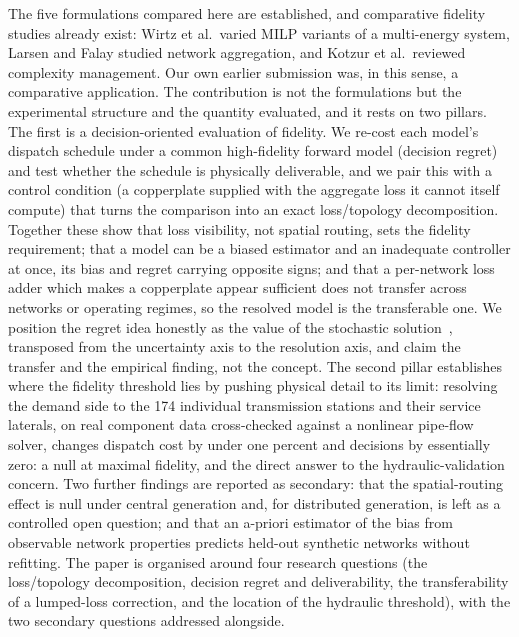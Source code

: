 \documentclass[a4paper,fleqn]{cas-sc}
\providecommand{\citep}[1]{\cite{#1}}
\begin{document}
The five formulations compared here are established, and comparative fidelity studies
already exist: Wirtz et al.\ varied MILP variants of a multi-energy system, Larsen and
Falay studied network aggregation, and Kotzur et al.\ reviewed complexity management. Our
own earlier submission was, in this sense, a comparative application. The contribution is
not the formulations but the experimental structure and the quantity evaluated, and it
rests on two pillars. The first is a decision-oriented evaluation of fidelity. We re-cost
each model's dispatch schedule under a common high-fidelity forward model (decision regret)
and test whether the schedule is physically deliverable, and we pair this with a control
condition (a copperplate supplied with the aggregate loss it cannot itself compute)
that turns the comparison into an exact loss/topology decomposition. Together these show
that loss visibility, not spatial routing, sets the fidelity requirement; that a model can
be a biased estimator and an inadequate controller at once, its bias and regret carrying
opposite signs; and that a per-network loss adder which makes a copperplate appear
sufficient does not transfer across networks or operating regimes, so the resolved model is
the transferable one. We position the regret idea honestly as the value of the stochastic
solution~\citep{BirgeLouveaux2011}, transposed from the uncertainty axis to the resolution
axis, and claim the transfer and the empirical finding, not the concept. The second pillar establishes where the fidelity
threshold lies by pushing physical detail to its limit: resolving the demand side to the 174
individual transmission stations and their service laterals, on real component data
cross-checked against a nonlinear pipe-flow solver, changes dispatch cost by under one
percent and decisions by essentially zero: a null at maximal fidelity, and the direct
answer to the hydraulic-validation concern. Two further findings are reported as secondary:
that the spatial-routing effect is null under central generation and, for distributed
generation, is left as a controlled open question; and that an a-priori estimator of the
bias from observable network properties predicts held-out synthetic networks without
refitting. The paper is organised around four research questions (the loss/topology
decomposition, decision regret and deliverability, the transferability of a lumped-loss
correction, and the location of the hydraulic threshold), with the two secondary questions
addressed alongside.
\end{document}
